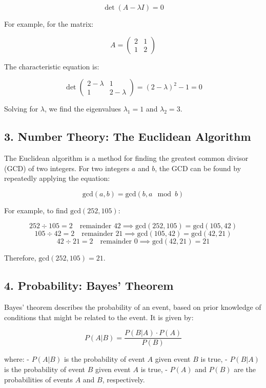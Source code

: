 \[
\det(A - \lambda I) = 0
\]

For example, for the matrix:

\[
A = \begin{pmatrix}
2 & 1 \\
1 & 2
\end{pmatrix}
\]

The characteristic equation is:

\[
\det\begin{pmatrix}
2 - \lambda & 1 \\
1 & 2 - \lambda
\end{pmatrix} = (2 - \lambda)^2 - 1 = 0
\]

Solving for $\lambda$, we find the eigenvalues $\lambda_1 = 1$ and $\lambda_2 = 3$.

\subsection*{3. Number Theory: The Euclidean Algorithm}

The Euclidean algorithm is a method for finding the greatest common divisor (GCD) of two integers. For two integers $a$ and $b$, the GCD can be found by repeatedly applying the equation:

\[
\text{gcd}(a, b) = \text{gcd}(b, a \mod b)
\]

For example, to find $\text{gcd}(252, 105)$:

\[
252 \div 105 = 2 \quad \text{remainder } 42 \implies \text{gcd}(252, 105) = \text{gcd}(105, 42)
\]
\[
105 \div 42 = 2 \quad \text{remainder } 21 \implies \text{gcd}(105, 42) = \text{gcd}(42, 21)
\]
\[
42 \div 21 = 2 \quad \text{remainder } 0 \implies \text{gcd}(42, 21) = 21
\]

Therefore, $\text{gcd}(252, 105) = 21$.

\subsection*{4. Probability: Bayes' Theorem}

Bayes' theorem describes the probability of an event, based on prior knowledge of conditions that might be related to the event. It is given by:

\[
P(A|B) = \frac{P(B|A) \cdot P(A)}{P(B)}
\]

where:
- $P(A|B)$ is the probability of event $A$ given event $B$ is true,
- $P(B|A)$ is the probability of event $B$ given event $A$ is true,
- $P(A)$ and $P(B)$ are the probabilities of events $A$ and $B$, respectively.


